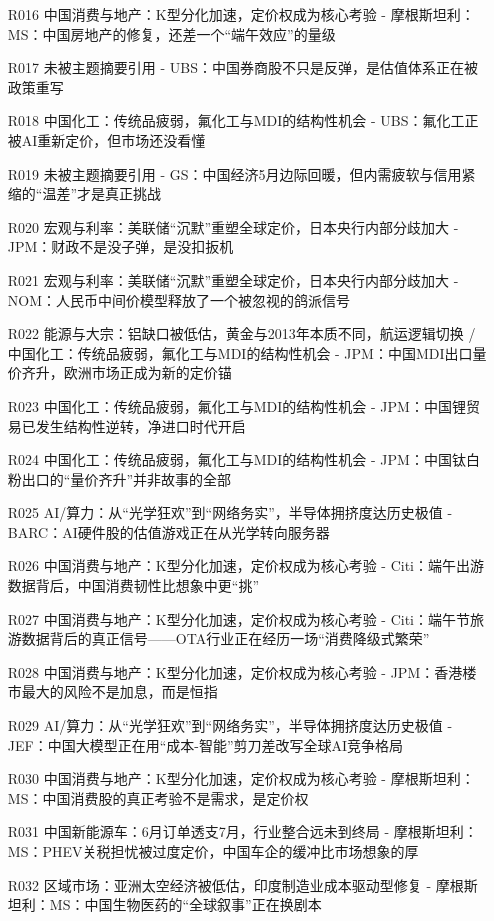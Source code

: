 \documentclass[11pt]{ctexart}
\begin{document}
\begin{itemize}
  \item [R016] 中国消费与地产：K型分化加速，定价权成为核心考验 - 摩根斯坦利：MS：中国房地产的修复，还差一个“端午效应”的量级
  \item [R017] 未被主题摘要引用 - UBS：中国券商股不只是反弹，是估值体系正在被政策重写
  \item [R018] 中国化工：传统品疲弱，氟化工与MDI的结构性机会 - UBS：氟化工正被AI重新定价，但市场还没看懂
  \item [R019] 未被主题摘要引用 - GS：中国经济5月边际回暖，但内需疲软与信用紧缩的“温差”才是真正挑战
  \item [R020] 宏观与利率：美联储“沉默”重塑全球定价，日本央行内部分歧加大 - JPM：财政不是没子弹，是没扣扳机
  \item [R021] 宏观与利率：美联储“沉默”重塑全球定价，日本央行内部分歧加大 - NOM：人民币中间价模型释放了一个被忽视的鸽派信号
  \item [R022] 能源与大宗：铝缺口被低估，黄金与2013年本质不同，航运逻辑切换 / 中国化工：传统品疲弱，氟化工与MDI的结构性机会 - JPM：中国MDI出口量价齐升，欧洲市场正成为新的定价锚
  \item [R023] 中国化工：传统品疲弱，氟化工与MDI的结构性机会 - JPM：中国锂贸易已发生结构性逆转，净进口时代开启
  \item [R024] 中国化工：传统品疲弱，氟化工与MDI的结构性机会 - JPM：中国钛白粉出口的“量价齐升”并非故事的全部
  \item [R025] AI/算力：从“光学狂欢”到“网络务实”，半导体拥挤度达历史极值 - BARC：AI硬件股的估值游戏正在从光学转向服务器
  \item [R026] 中国消费与地产：K型分化加速，定价权成为核心考验 - Citi：端午出游数据背后，中国消费韧性比想象中更“挑”
  \item [R027] 中国消费与地产：K型分化加速，定价权成为核心考验 - Citi：端午节旅游数据背后的真正信号——OTA行业正在经历一场“消费降级式繁荣”
  \item [R028] 中国消费与地产：K型分化加速，定价权成为核心考验 - JPM：香港楼市最大的风险不是加息，而是恒指
  \item [R029] AI/算力：从“光学狂欢”到“网络务实”，半导体拥挤度达历史极值 - JEF：中国大模型正在用“成本-智能”剪刀差改写全球AI竞争格局
  \item [R030] 中国消费与地产：K型分化加速，定价权成为核心考验 - 摩根斯坦利：MS：中国消费股的真正考验不是需求，是定价权
  \item [R031] 中国新能源车：6月订单透支7月，行业整合远未到终局 - 摩根斯坦利：MS：PHEV关税担忧被过度定价，中国车企的缓冲比市场想象的厚
  \item [R032] 区域市场：亚洲太空经济被低估，印度制造业成本驱动型修复 - 摩根斯坦利：MS：中国生物医药的“全球叙事”正在换剧本

\end{itemize}
\end{document}
